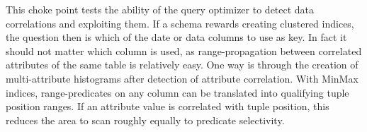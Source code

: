 
This choke point tests the ability of the query optimizer to detect data
correlations and exploiting them. If a schema rewards creating clustered
indices, the question then is which of the date or data columns to use as key.
In fact it should not matter which column is used, as range-propagation between
correlated attributes of the same table is relatively easy. One way is through
the creation of multi-attribute histograms after detection of attribute
correlation. With MinMax indices, range-predicates on any column can be
translated into qualifying tuple position ranges. If an attribute value is
correlated with tuple position, this reduces the area to scan roughly equally to
predicate selectivity.


